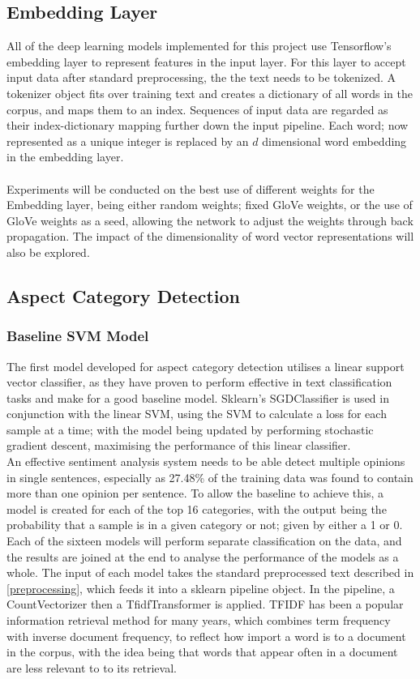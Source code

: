 \documentclass[11pt]{article}
\begin{document}
\subsection{Embedding Layer}
All of the deep learning models implemented for this project use Tensorflow's embedding layer to represent features in the input layer. For this layer to accept input data after standard preprocessing, the the text needs to be tokenized. A tokenizer object fits over training text and creates a dictionary of all words in the corpus, and maps them to an index. Sequences of input data are regarded as their index-dictionary mapping further down the input pipeline. Each word; now represented as a unique integer is replaced by an $d$ dimensional word embedding in the embedding layer. \\\\
Experiments will be conducted on the best use of different weights for the Embedding layer, being either random weights; fixed GloVe weights, or the use of GloVe weights as a seed, allowing the network to adjust the weights through back propagation. The impact of the dimensionality of word vector representations will also be explored.   

\subsection{Aspect Category Detection}
\subsubsection{Baseline SVM Model}
The first model developed for aspect category detection utilises a linear support vector classifier, as they have proven to perform effective in text classification tasks and make for a good baseline model. Sklearn's SGDClassifier is used in conjunction with the linear SVM, using the SVM to calculate a loss for each sample at a time; with the model being updated by performing stochastic gradient descent, maximising the performance of this linear classifier. \\

An effective sentiment analysis system needs to be able detect multiple opinions in single sentences, especially as 27.48\% of the training data was found to contain more than one opinion per sentence. To allow the baseline to achieve this, a model is created for each of the top 16 categories, with the output being the probability that a sample is in a given category or not; given by either a 1 or 0. Each of the sixteen models will perform separate classification on the data, and the results are joined at the end to analyse the performance of the models as a whole. 
The input of each model takes the standard preprocessed text described in \ref{preprocessing}, which feeds it into a sklearn pipeline object. In the pipeline, a CountVectorizer then a TfidfTransformer is applied. TFIDF has been a popular information retrieval method for many years, which combines term frequency with inverse document frequency, to reflect how import a word is to a document in the corpus, with the idea being that words that appear often in a document are less relevant to to its retrieval.   
\end{document}
